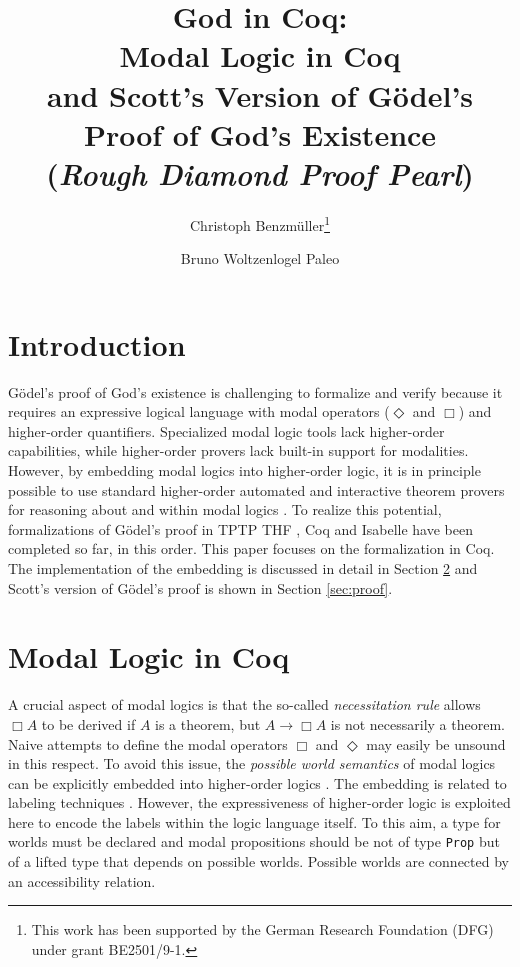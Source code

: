 \documentclass{llncs}
\title{
God in Coq: \\
Modal Logic in Coq \\ 
and Scott's Version of G\"{o}del's Proof of God's Existence \\
{\small (\emph{Rough Diamond Proof Pearl})}
}
\author{
  Christoph Benzm\"{u}ller\inst{1}\thanks{This work has been supported by the German Research Foundation (DFG) under grant BE2501/9-1.} 
  \and 
  Bruno Woltzenlogel Paleo\inst{2}
}
\institute{
  Dahlem Center for Intelligent Systems, Freie Universit\"{a}t Berlin, Germany\\
  \email{c.benzmueller@gmail.com}
  \and 
  Theory and Logic Group, Vienna University of Technology, Austria \\
  \email{bruno@logic.at}
}
\newcommand{\imp}{\rightarrow}
\begin{document}
\maketitle

\section{Introduction}

G\"{o}del's proof of God's existence is challenging to formalize and
verify because it requires an expressive logical language with modal
operators ($\Diamond$ and $\Box$) and higher-order quantifiers.
Specialized modal logic tools lack higher-order capabilities, while
higher-order provers lack built-in support for modalities.  However,
by embedding modal logics into higher-order logic, it is in principle
possible to use standard higher-order automated and interactive
theorem provers for reasoning about and within modal logics
\cite{J23,B9}.  To realize this potential, formalizations
\cite{FormalTheologyRepository} of G\"odel's proof in TPTP THF
\cite{J22}, Coq \cite{Coq} and Isabelle \cite{Isabelle} have been
completed so far, in this order. This paper focuses on the
formalization in Coq. The implementation of the embedding is discussed
in detail in Section \ref{sec:modal} and Scott's version of G\"odel's
proof is shown in Section \ref{sec:proof}.


\section{Modal Logic in Coq}
\label{sec:modal}

A crucial aspect of modal logics \cite{ModalLogic} is that the so-called \emph{necessitation rule} allows $\Box A$ to be derived if $A$ is a theorem, but $A \imp \Box A$ is not necessarily a theorem. Naive attempts to define the modal operators $\Box$ and $\Diamond$ may easily be unsound in this respect. To avoid this issue, the \emph{possible world semantics} of modal logics can be explicitly embedded into higher-order logics \cite{J23,B9}. The embedding is related to labeling techniques
\cite{Labels}. However, the expressiveness of higher-order logic is
exploited here to encode the labels within the logic language itself. To this aim, a type for worlds must be declared and modal propositions should be not of type \texttt{Prop} but of a lifted type that depends on possible worlds. Possible worlds are connected by an accessibility relation.

\newcommand{\verbsize}{\small}
\end{document}

